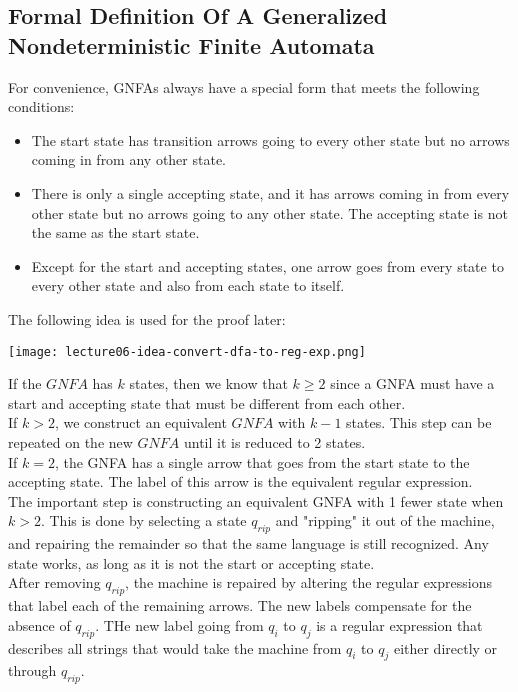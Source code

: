 \documentclass[11pt,a4paper]{article}
\begin{document}
\subsection{Formal Definition Of A Generalized Nondeterministic Finite Automata}
For convenience, GNFAs always have a special form that meets the following conditions:
\begin{itemize}
    \item The start state has transition arrows going to every other state but no arrows coming in from any other state.
    \item There is only a single accepting state, and it has arrows coming in from every other state but no arrows going to any other state. The accepting state is not the same as the start state.
    \item Except for the start and accepting states, one arrow goes from every state to every other state and also from each state to itself.
\end{itemize}

The following idea is used for the proof later:

\texttt{[image: lecture06-idea-convert-dfa-to-reg-exp.png]}

If the $GNFA$ has $k$ states, then we know that $k\geq 2$ since a GNFA must have a start and accepting state that must be different from each other. \\

If $k>2$, we construct an equivalent $GNFA$ with $k-1$ states. This step can be repeated on the new $GNFA$ until it is reduced to 2 states. \\

If $k=2$, the GNFA has a single arrow that goes from the start state to the accepting state. The label of this arrow is the equivalent regular expression. \\

The important step is constructing an equivalent GNFA with 1 fewer state when $k>2$.
This is done by selecting a state $q_{rip}$ and "ripping" it out of the machine, and repairing the remainder so that the same language is still recognized.
Any state works, as long as it is not the start or accepting state. \\

After removing $q_{rip}$, the machine is repaired by altering the regular expressions that label each of the remaining arrows.
The new labels compensate for the absence of $q_{rip}$. THe new label going from $q_i$ to $q_j$ is a regular expression that describes all strings that would take the machine from $q_i$ to $q_j$ either directly or through $q_{rip}$.
\end{document}
